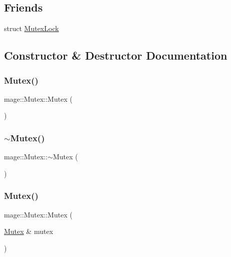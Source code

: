 \subsection*{Friends}
\begin{DoxyCompactItemize}
\item 
struct \hyperlink{classmage_1_1_mutex_a058473d070063e5098732f355f432bd9}{Mutex\+Lock}
\end{DoxyCompactItemize}


\subsection{Constructor \& Destructor Documentation}
\hypertarget{classmage_1_1_mutex_ab22db01311271ef54642b10ea53dfd8a}{}\label{classmage_1_1_mutex_ab22db01311271ef54642b10ea53dfd8a} 
\subsubsection{\texorpdfstring{Mutex()}{Mutex()}\hspace{0.1cm}{\footnotesize\ttfamily [1/2]}}
{\footnotesize\ttfamily mage\+::\+Mutex\+::\+Mutex (\begin{DoxyParamCaption}{ }\end{DoxyParamCaption})\hspace{0.3cm}{\ttfamily [private]}}

\hypertarget{classmage_1_1_mutex_a143d82ec7bb43f953a1703caa7972e9d}{}\label{classmage_1_1_mutex_a143d82ec7bb43f953a1703caa7972e9d} 
\subsubsection{\texorpdfstring{$\sim$\+Mutex()}{~Mutex()}}
{\footnotesize\ttfamily mage\+::\+Mutex\+::$\sim$\+Mutex (\begin{DoxyParamCaption}{ }\end{DoxyParamCaption})\hspace{0.3cm}{\ttfamily [private]}}

\hypertarget{classmage_1_1_mutex_a0f38f170668eb1fe3c2f110738edc39e}{}\label{classmage_1_1_mutex_a0f38f170668eb1fe3c2f110738edc39e} 
\subsubsection{\texorpdfstring{Mutex()}{Mutex()}\hspace{0.1cm}{\footnotesize\ttfamily [2/2]}}
{\footnotesize\ttfamily mage\+::\+Mutex\+::\+Mutex (\begin{DoxyParamCaption}\item[{\hyperlink{classmage_1_1_mutex}{Mutex} \&}]{mutex }\end{DoxyParamCaption})\hspace{0.3cm}{\ttfamily [private]}}



